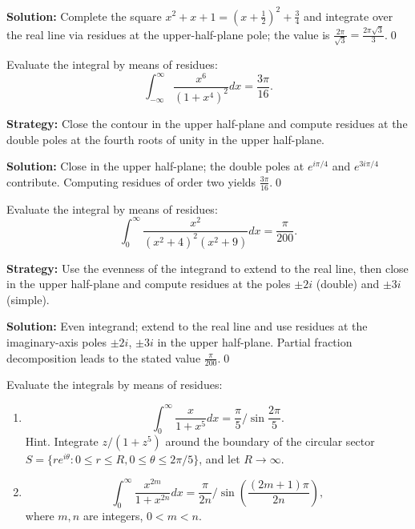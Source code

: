 \bigskip\noindent\textbf{Solution:}
Complete the square $x^2+x+1=(x+\tfrac12)^2+\tfrac34$ and integrate over the real line via residues at the upper-half-plane pole; the value is $\frac{2\pi}{\sqrt{3}}=\frac{2\pi\sqrt{3}}{3}$.\qed


\begin{problembox}
\begin{problemstatement}
Evaluate the integral by means of residues:
\[ \int_{-\infty}^{\infty} \frac{x^6}{(1 + x^4)^2} dx = \frac{3\pi}{16}. \]
\end{problemstatement}
\end{problembox}

\noindent\textbf{Strategy:} Close the contour in the upper half-plane and compute residues at the double poles at the fourth roots of unity in the upper half-plane.

\bigskip\noindent\textbf{Solution:}
Close in the upper half-plane; the double poles at $e^{i\pi/4}$ and $e^{3i\pi/4}$ contribute. Computing residues of order two yields $\frac{3\pi}{16}$.\qed


\begin{problembox}
\begin{problemstatement}
Evaluate the integral by means of residues:
\[ \int_0^{\infty} \frac{x^2}{(x^2 + 4)^2 (x^2 + 9)} dx = \frac{\pi}{200}. \]
\end{problemstatement}
\end{problembox}

\noindent\textbf{Strategy:} Use the evenness of the integrand to extend to the real line, then close in the upper half-plane and compute residues at the poles \( \pm 2i \) (double) and \( \pm 3i \) (simple).

\bigskip\noindent\textbf{Solution:}
Even integrand; extend to the real line and use residues at the imaginary-axis poles $\pm2i$, $\pm3i$ in the upper half-plane. Partial fraction decomposition leads to the stated value $\frac{\pi}{200}$.\qed


\begin{problembox}
\begin{problemstatement}
Evaluate the integrals by means of residues:
\begin{enumerate}[label=(\alph*)]
\item \[ \int_0^{\infty} \frac{x}{1 + x^5} dx = \frac{\pi}{5} / \sin \frac{2\pi}{5}. \]
Hint. Integrate \( z / (1 + z^5) \) around the boundary of the circular sector \( S = \{ r e^{i\theta} : 0 \leq r \leq R, 0 \leq \theta \leq 2\pi / 5 \} \), and let \( R \to \infty \).
\item \[ \int_0^{\infty} \frac{x^{2m}}{1 + x^{2n}} dx = \frac{\pi}{2n}/ \sin \left( \frac{(2m + 1) \pi}{2n} \right), \]
where \( m, n \) are integers, \( 0 < m < n \).
\end{enumerate}
\end{problemstatement}
\end{problembox}

